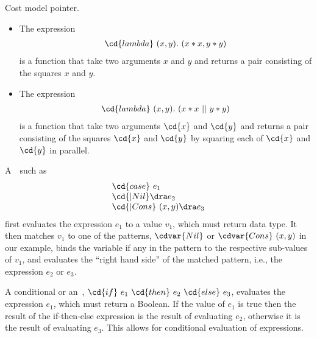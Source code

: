 \begin{teachnote}
Cost model pointer.
\end{teachnote}

\begin{example}

\begin{itemize}

\item

The expression 
\[
\begin{array}{l}
\cd{lambda}~(x, y).~(x * x, y * y)
\end{array}
\]
is a function that take two arguments $x$ and $y$ and returns a
pair consisting of the squares $x$ and $y$.
%

\item
The expression
\[
\begin{array}{l}
\cd{lambda}~(x, y).~(x * x~||~y * y)
\end{array}
\]
is a function that take two arguments $\cd{x}$ and $\cd{y}$ and returns a
pair consisting of the squares $\cd{x}$ and $\cd{y}$ by squaring each of
$\cd{x}$ and $\cd{y}$ in parallel.
\end{itemize}

\end{example}


\begin{gram}
A~~such as 
%
\[
\begin{array}{l}
\cd{case}~e_1 \\
\cd{| Nil}\dra e_2 \\ 
\cd{| Cons}~(x,y)\dra e_3 \\
\end{array}
\]
%
first evaluates the expression $e_1$ to a value $v_1$, which must
return data type.
%
It then matches $v_1$ to one of the patterns, $\cdvar{Nil}$ or
$\cdvar{Cons}~(x,y)$ in our example, binds the variable if any in the
pattern to the respective sub-values of $v_1$, and evaluates the
``right hand side'' of the matched pattern, i.e., the expression $e_2$
or $e_3$.
\end{gram}

\begin{gram}[Conditionals]
A conditional or an~,
$\cd{if}~e_1~\cd{then}~e_2~\cd{else}~e_3$, evaluates the expression $e_1$,
which must return a Boolean.
%
If the value of $e_1$ is true then the result of the if-then-else
expression is the result of evaluating $e_2$, otherwise it is the
result of evaluating $e_3$.  
%
This allows for conditional evaluation of expressions.
\end{gram}


